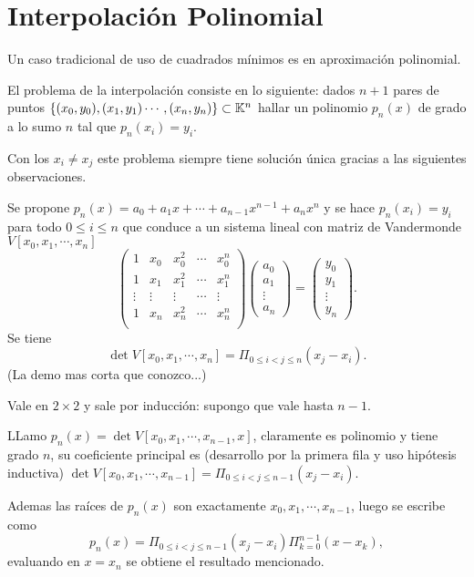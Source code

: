 \section{Interpolación Polinomial}
Un caso tradicional de uso de cuadrados mínimos es en aproximación polinomial. 

El problema de la interpolación consiste en lo siguiente: dados $n+1$ pares de puntos $\{(x_{0},y_{0}),(x_{1},y_{1})\cdots ,(x_{n},y_{n})\}\subset \mathbb K^{n}$ hallar un polinomio $p_{n}(x)$ de grado a lo sumo $n$ tal que $p_{n}(x_{i})=y_{i}$.


Con los $x_{i}\neq x_{j}$ este problema siempre tiene solución única gracias a las siguientes observaciones.


 
 Se propone $p_{n}(x)=a_{0}+ a_{1}x+\cdots +a_{n-1}x^{n-1} +a_{n}x^{n}$ y se hace $p_{n}(x_{i})=y_{i}$ para todo $0\le i\le n$ que conduce a un sistema lineal con matriz de Vandermonde $V[x_0,x_1,\cdots,x_n]$
 $$
 \begin{pmatrix}
 1&x_{0}&x_{0}^{2}&\cdots &x_{0}^{n}\\
 1&x_{1}&x_{1}^{2}&\cdots &x_{1}^{n}\\
 \vdots&\vdots&\vdots&\cdots&\vdots\\
 1&x_{n}&x_{n}^{2}&\cdots &x_{n}^{n}\\
 \end{pmatrix}
 \begin{pmatrix}
 a_{0}\\
 a_{1}\\
 \vdots\\
 a_{n}
 \end{pmatrix}=
 \begin{pmatrix}
y_{0}\\
 y_{1}\\
 \vdots\\
 y_{n}
 \end{pmatrix}.
 $$
 Se tiene
 $$
 \det V[x_0,x_1,\cdots,x_n]=\Pi_{0\le i<j\le n}(x_j-x_i).
 $$
 (La demo mas corta que conozco...) 
 
 Vale en $2\times 2$ y sale por inducción: supongo que vale hasta $n-1$. 
 
 LLamo
 $p_n(x)=\det V[x_0,x_1,\cdots,x_{n-1},x]$, claramente es polinomio y tiene grado $n$, su coeficiente principal es (desarrollo por la primera fila y uso hipótesis inductiva) $\det V[x_0,x_1,\cdots,x_{n-1}]=\Pi_{0\le i<j\le n-1}(x_j-x_i)$.
 
  Ademas las raíces de $p_n(x)$ son exactamente $x_0,x_1,\cdots, x_{n-1}$, luego se escribe como
 $$
 p_n(x)=\Pi_{0\le i<j\le n-1}(x_j-x_i)\Pi_{k=0}^{n-1}(x-x_k),
 $$
 evaluando en $x=x_n$ se obtiene el resultado mencionado. 
 
